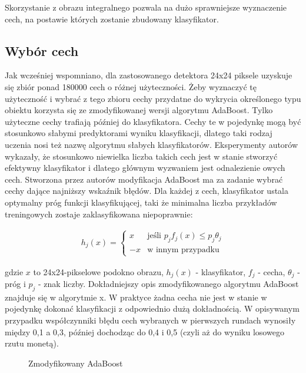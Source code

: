 \documentclass[12pt,a4paper,leqno,oneside,titlepage]{book}
\begin{document}
Skorzystanie z obrazu integralnego pozwala na dużo sprawniejsze wyznaczenie cech, na postawie których zostanie zbudowany klasyfikator.

\subsection{Wybór cech}

Jak wcześniej wspomniano, dla zastosowanego detektora 24x24 piksele uzyskuje się zbiór ponad 180000 cech o różnej użyteczności. Żeby wyznaczyć tę użyteczność i wybrać z tego zbioru cechy przydatne do wykrycia określonego typu obiektu korzysta się ze zmodyfikowanej wersji algorytmu AdaBoost. Tylko użyteczne cechy trafiają później do klasyfikatora. Cechy te w pojedynkę mogą być stosunkowo słabymi predyktorami wyniku klasyfikacji, dlatego taki rodzaj uczenia nosi też nazwę algorytmu słabych klasyfikatorów. Eksperymenty autorów wykazały, że stosunkowo niewielka liczba takich cech jest w stanie stworzyć efektywny klasyfikator i dlatego głównym wyzwaniem jest odnalezienie owych cech.
Stworzona przez autorów modyfikacja AdaBoost ma za zadanie wybrać cechy dające najniższy wskaźnik błędów. Dla każdej z cech, klasyfikator  ustala optymalny próg funkcji klasyfikującej, taki że minimalna liczba przykładów treningowych zostaje zaklasyfikowana niepoprawnie:

\begin{align}
h_{j}(x) = \left.
	\begin{cases}
		x  & \text{jeśli } p_{j}f_{j}(x) \leq p_{j}\theta_{j} \\
		-x & \text{w innym przypadku}
	\end{cases}
	\right.
\end{align}

gdzie $x$ to 24x24-pikselowe podokno obrazu, $h_{j}(x)$ - klasyfikator, $f_{j}$ - cecha, $\theta_{j}$ - próg i $p_{j}$ - znak liczby. Dokładniejszy opis zmodyfikowanego algorytmu AdaBoost znajduje się w algorytmie x. W praktyce żadna cecha nie jest w stanie w pojedynkę dokonać klasyfikacji z odpowiednio dużą dokładnością. W opisywanym przypadku współczynniki błędu cech wybranych w pierwszych rundach wynosiły między 0,1 a 0,3, później dochodząc do 0,4 i 0,5 (czyli aż do wyniku losowego rzutu monetą).\cite{ViolaJones01}

\begin{figure}[!tbp]
\noindent{}
\caption{Zmodyfikowany AdaBoost}
\end{figure}
\end{document}
